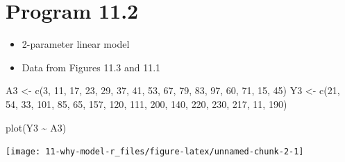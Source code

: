 \documentclass[
  10pt,
  a4paper,
]{book}
\newenvironment{Shaded}{\begin{snugshade}}{\end{snugshade}}
\newcommand{\DecValTok}[1]{\textcolor[rgb]{0.68,0.00,0.00}{#1}}
\newcommand{\FunctionTok}[1]{\textcolor[rgb]{0.28,0.35,0.67}{#1}}
\newcommand{\NormalTok}[1]{\textcolor[rgb]{0.00,0.46,0.62}{#1}}
\newcommand{\OtherTok}[1]{\textcolor[rgb]{0.00,0.46,0.62}{#1}}
\newcommand{\SpecialCharTok}[1]{\textcolor[rgb]{0.37,0.37,0.37}{#1}}
\providecommand{\tightlist}{%
  \setlength{\itemsep}{0pt}\setlength{\parskip}{0pt}}
\begin{document}
\section{Program 11.2}\label{program-11.2}

\begin{itemize}
\tightlist
\item
  2-parameter linear model
\item
  Data from Figures 11.3 and 11.1
\end{itemize}

\begin{Shaded}
\begin{Highlighting}[]
\NormalTok{A3 }\OtherTok{\textless{}{-}}
  \FunctionTok{c}\NormalTok{(}\DecValTok{3}\NormalTok{, }\DecValTok{11}\NormalTok{, }\DecValTok{17}\NormalTok{, }\DecValTok{23}\NormalTok{, }\DecValTok{29}\NormalTok{, }\DecValTok{37}\NormalTok{, }\DecValTok{41}\NormalTok{, }\DecValTok{53}\NormalTok{, }\DecValTok{67}\NormalTok{, }\DecValTok{79}\NormalTok{, }\DecValTok{83}\NormalTok{, }\DecValTok{97}\NormalTok{, }\DecValTok{60}\NormalTok{, }\DecValTok{71}\NormalTok{, }\DecValTok{15}\NormalTok{, }\DecValTok{45}\NormalTok{)}
\NormalTok{Y3 }\OtherTok{\textless{}{-}}
  \FunctionTok{c}\NormalTok{(}\DecValTok{21}\NormalTok{, }\DecValTok{54}\NormalTok{, }\DecValTok{33}\NormalTok{, }\DecValTok{101}\NormalTok{, }\DecValTok{85}\NormalTok{, }\DecValTok{65}\NormalTok{, }\DecValTok{157}\NormalTok{, }\DecValTok{120}\NormalTok{, }\DecValTok{111}\NormalTok{, }\DecValTok{200}\NormalTok{, }\DecValTok{140}\NormalTok{, }\DecValTok{220}\NormalTok{, }\DecValTok{230}\NormalTok{, }\DecValTok{217}\NormalTok{,}
    \DecValTok{11}\NormalTok{, }\DecValTok{190}\NormalTok{)}

\FunctionTok{plot}\NormalTok{(Y3 }\SpecialCharTok{\textasciitilde{}}\NormalTok{ A3)}
\end{Highlighting}
\end{Shaded}

\begin{center}\texttt{[image: 11-why-model-r\_files/figure-latex/unnamed-chunk-2-1]} \end{center}
\end{document}
